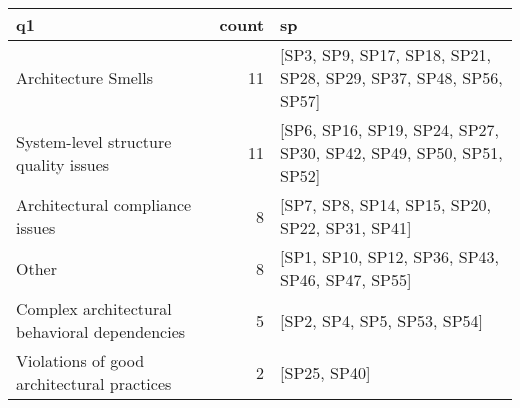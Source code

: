 \begin{tabular}{lrl}
\toprule
                                            q1 &  count &                                                                 sp \\
\midrule
                           Architecture Smells &     11 &   [SP3, SP9, SP17, SP18, SP21, SP28, SP29, SP37, SP48, SP56, SP57] \\
         System-level structure quality issues &     11 &  [SP6, SP16, SP19, SP24, SP27, SP30, SP42, SP49, SP50, SP51, SP52] \\
               Architectural compliance issues &      8 &                     [SP7, SP8, SP14, SP15, SP20, SP22, SP31, SP41] \\
                                         Other &      8 &                    [SP1, SP10, SP12, SP36, SP43, SP46, SP47, SP55] \\
 Complex architectural behavioral dependencies &      5 &                                        [SP2, SP4, SP5, SP53, SP54] \\
    Violations of good architectural practices &      2 &                                                       [SP25, SP40] \\
\bottomrule
\end{tabular}
